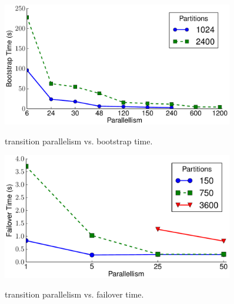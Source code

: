 \begin{figure}[t]
  \begin{minipage}[t]{0.48\textwidth}
    {\includegraphics[width=0.90\textwidth]{bootstrap.pdf}}
    \vspace*{-2ex}
    \caption{\label{fig:bootstrap_time} \ES transition parallelism vs. bootstrap time.}
  \end{minipage}
  \hfill
  \begin{minipage}[t]{0.48\textwidth}
    {\includegraphics[width=0.90\textwidth]{failure.pdf}}
    \vspace*{-2ex}
    \caption{\label{fig:failure_detection} \ES transition parallelism vs. failover time.}
    \end{minipage}
    \vspace*{-2ex}
\end{figure}





